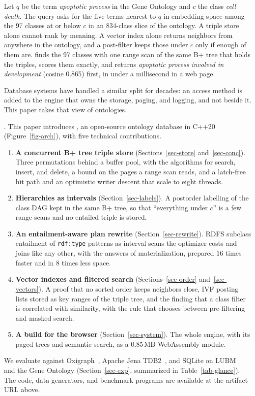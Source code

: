 \begin{example}
\label{exa-motivation}
Let $q$ be the term \emph{apoptotic process} in the Gene Ontology and $c$ the
class \emph{cell death}.
The query asks for the five terms nearest to $q$ in embedding space among
the 97 classes at or below $c$ in an 834-class slice of the ontology.
A triple store alone cannot rank by meaning.
A vector index alone returns neighbors from anywhere in the ontology, and
a post-filter keeps those under $c$ only if enough of them are.
\sys finds the 97 classes with one range scan of the same B+ tree that holds
the triples, scores them exactly, and returns \emph{apoptotic process
involved in development} (cosine 0.865) first, in under a millisecond in a
web page.
\end{example}

Database systems have handled a similar split for decades: an access method
is added to the engine that owns the storage, paging, and logging, and not
beside it.
This paper takes that view of ontologies.

.
This paper introduces \sys, an open-source ontology database in C++20
(Figure~\ref{fig-arch}), with five technical contributions.
\begin{enumerate}
\item \textbf{A concurrent B+ tree triple store} (Sections~\ref{sec-store}
  and~\ref{sec-conc}). Three permutations behind a buffer pool, with the
  algorithms for search, insert, and delete, a bound on the pages a range scan
  reads, and a latch-free hit path and an optimistic writer descent that scale
  to eight threads.
\item \textbf{Hierarchies as intervals} (Section~\ref{sec-labels}). A
  postorder labelling of the class DAG kept in the same B+ tree, so that
  ``everything under $c$'' is a few range scans and no entailed triple is
  stored.
\item \textbf{An entailment-aware plan rewrite} (Section~\ref{sec-rewrite}).
  RDFS subclass entailment of \texttt{rdf:type} patterns as interval scans the
  optimizer costs and joins like any other, with the answers of
  materialization, prepared 16 times faster and in 8 times less space.
\item \textbf{Vector indexes and filtered search}
  (Sections~\ref{sec-order} and~\ref{sec-vectors}). A proof that no sorted
  order keeps neighbors close, IVF posting lists stored as key ranges of the
  triple tree, and the finding that a class filter is correlated with
  similarity, with the rule that chooses between pre-filtering and masked
  search.
\item \textbf{A build for the browser} (Section~\ref{sec-system}). The whole
  engine, with its paged trees and semantic search, as a 0.85\,MB WebAssembly
  module.
\end{enumerate}
We evaluate \sys against Oxigraph~\cite{oxigraph}, Apache Jena
TDB2~\cite{jenatdb}, and SQLite on LUBM~\cite{lubm} and the Gene Ontology
(Section~\ref{sec-exp}, summarized in Table~\ref{tab-glance}).
The code, data generators, and benchmark programs are available at the
artifact URL above.
